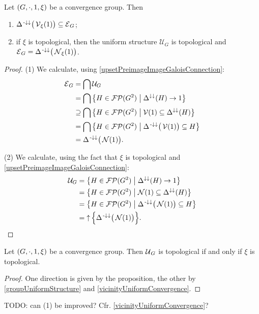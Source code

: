 \begin{proposition} \label{entourageConvergenceGroup}
Let $\sSet{G,\cdot, 1, \xi}$ be a convergence group. Then
\begin{enumerate}
\item $\Delta^{{\text{\hspace{0.15em}-}\downarrow}\downarrow}\big(\operatorname{\mathcal{V}}_\xi(1)\big) \subseteq \operatorname{\mathcal{E}}_{G}$;
\item if $\xi$ is topological, then the uniform structure $\mathcal{U}_G$ is topological and $\operatorname{\mathcal{E}}_{G} = \Delta^{{\text{\hspace{0.15em}-}\downarrow}\downarrow}\big(\operatorname{\mathcal{N}}_\xi(1)\big)$.
\end{enumerate}
\end{proposition}
\begin{proof}
(1) We calculate, using \ref{upsetPreimageImageGaloisConnection}:
\begin{align*}
\entourage_G &= \bigcap \mathcal{U}_G \\
&= \bigcap \setbuilder{H\in \powerfilters(G^2)}{\Delta^{\imf\imf}(H) \to 1} \\
&\supseteq \bigcap \setbuilder{H\in \powerfilters(G^2)}{\vicinity(1) \subseteq \Delta^{\imf\imf}(H)} \\
&= \bigcap \setbuilder{H\in \powerfilters(G^2)}{\Delta^{\preimf\imf}\big(\vicinity(1)\big) \subseteq H} \\
&= \Delta^{\preimf\imf}\big(\neighbourhood(1)\big).
\end{align*}

(2) We calculate, using the fact that $\xi$ is topological and \ref{upsetPreimageImageGaloisConnection}:
\begin{align*}
\mathcal{U}_G &= \setbuilder{H\in \powerfilters(G^2)}{\Delta^{\imf\imf}(H) \to 1} \\
&= \setbuilder{H\in \powerfilters(G^2)}{\neighbourhood(1) \subseteq \Delta^{\imf\imf}(H)} \\
&= \setbuilder{H\in \powerfilters(G^2)}{\Delta^{\preimf\imf}\big(\neighbourhood(1)\big) \subseteq H} \\
&= \upset\Big\{\Delta^{\preimf\imf}\big(\neighbourhood(1)\big)\Big\}.
\end{align*}
\end{proof}
\begin{corollary} \label{convergenceGroupTopologicalIffUniformlyTopological}
Let $\sSet{G, \cdot, 1, \xi}$ be a convergence group. Then $\operatorname{\mathcal{U}}_G$ is topological \textup{if and only if} $\xi$ is topological.
\end{corollary}
\begin{proof}
One direction is given by the proposition, the other by \ref{groupUniformStructure} and \ref{vicinityUniformConvergence}.
\end{proof}
TODO: can (1) be improved? Cfr. \ref{vicinityUniformConvergence}?

